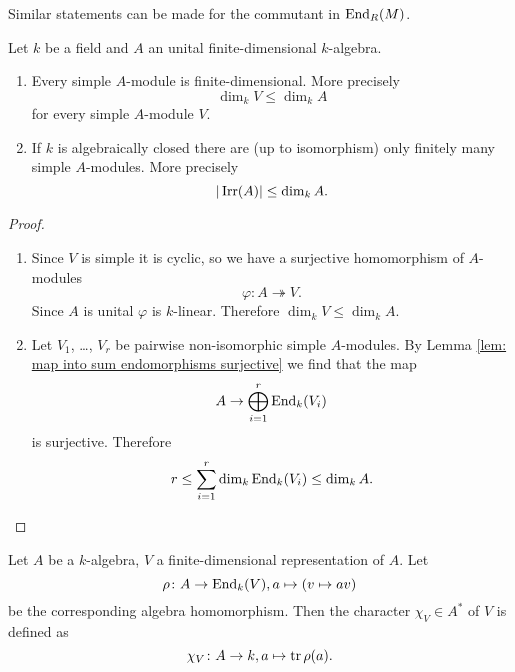 \begin{rem}
 Similar statements can be made for the commutant in $\operatorname{End}_R(M)$.
\end{rem}


\begin{prop}
 Let $k$ be a field and $A$ an unital finite-dimensional $k$-algebra.
 \begin{enumerate}[label=\emph{\alph*})]
  \item
   Every simple $A$-module is finite-dimensional. More precisely
   \[
    \dim_k V \leq \dim_k A
   \]
   for every simple $A$-module $V$.
  \item
   If $k$ is algebraically closed there are (up to isomorphism) only finitely many simple $A$-modules. More precisely
   \[
    |\operatorname{Irr}(A)| \leq \dim_k A.
   \]
 \end{enumerate}
\end{prop}
\begin{proof}
 \begin{enumerate}[label=\emph{\alph*})]
  \item
   Since $V$ is simple it is cyclic, so we have a surjective homomorphism of $A$-modules
   \[
    \varphi \colon A \twoheadrightarrow V.
   \]
   Since $A$ is unital $\varphi$ is $k$-linear. Therefore $\dim_k V \leq \dim_k A$.
  \item
   Let $V_1$, \dots, $V_r$ be pairwise non-isomorphic simple $A$-modules. By Lemma \ref{lem: map into sum endomorphisms surjective} we find that the map
   \[
    A \to \bigoplus_{i=1}^r \operatorname{End}_k(V_i)
   \]
   is surjective. Therefore
   \[
    r \leq \sum_{i=1}^r \dim_k \operatorname{End}_k(V_i) \leq \dim_k A.
   \]
 \end{enumerate}
\end{proof}


\begin{defi}
 Let $A$ be a $k$-algebra, $V$ a finite-dimensional representation of $A$. Let
 \[
  \rho \colon A \to \operatorname{End}_k(V), a \mapsto (v \mapsto av)
 \]
 be the corresponding algebra homomorphism. Then the character $\chi_V \in A^*$ of $V$ is defined as
 \[
  \chi_V \colon A \to k, a \mapsto \operatorname{tr} \rho(a).
 \]
\end{defi}


